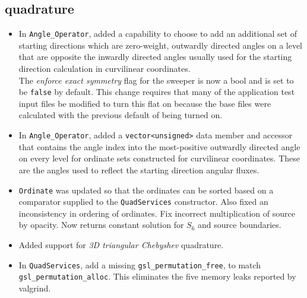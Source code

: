 \documentclass[note]{ResearchNote_pdf}
\begin{document}
\subsection{quadrature}
\label{changes:quadrature}
\begin{itemize}

\item In \texttt{Angle\_Operator}, added a capability to choose to add
  an additional set of starting directions which are zero-weight,
  outwardly directed angles on a level that are opposite the inwardly
  directed angles usually used for the starting direction calculation
  in curvilinear coordinates. \\
  The \textit{enforce exact symmetry} flag for the sweeper is now a
  bool and is set to be \texttt{false} by default. This change
  requires that many of the application test input files be modified
  to turn this flat on because the base files were calculated with the
  previous default of being turned on.

\item In \texttt{Angle\_Operator}, added a \texttt{vector<unsigned>}
  data member and accessor that contains the angle index into the
  most-positive outwardly directed angle on every level for ordinate
  sets constructed for curvilinear coordinates.  These are the angles
  used to reflect the starting direction angular fluxes.

\item \texttt{Ordinate} was updated so that the ordinates can be
  sorted based on a comparator supplied to the \texttt{QuadServices}
  constructor.  Also fixed an inconsistency in ordering of
  ordinates. Fix incorrect multiplication of source by opacity. Now
  returns constant solution for $S_6$ and source boundaries.

\item Added support for \textit{3D triangular Chebyshev} quadrature.

\item In \texttt{QuadServices}, add a missing
  \texttt{gsl\_permutation\_free}, to match
  \texttt{gsl\_permutation\_alloc}. This eliminates the five memory
  leaks reported by \textsf{valgrind}. 
\end{itemize}

\end{document}
